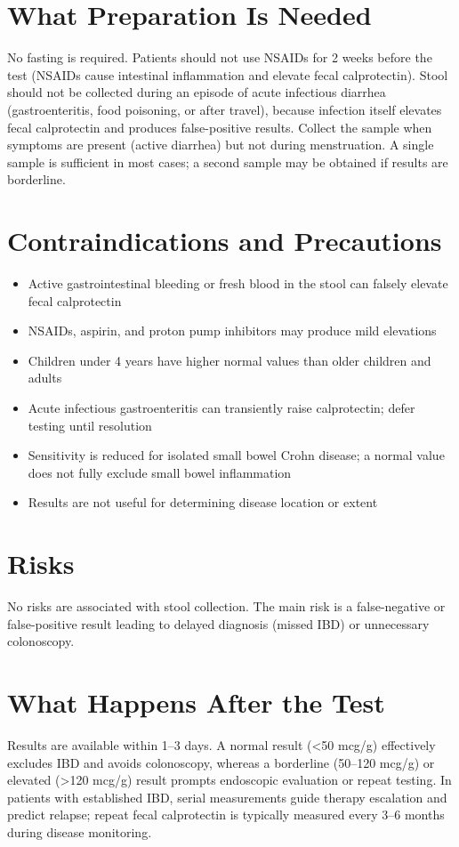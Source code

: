 \section*{What Preparation Is Needed}
No fasting is required. Patients should not use NSAIDs for 2 weeks before the test (NSAIDs cause intestinal inflammation and elevate fecal calprotectin). Stool should not be collected during an episode of acute infectious diarrhea (gastroenteritis, food poisoning, or after travel), because infection itself elevates fecal calprotectin and produces false-positive results. Collect the sample when symptoms are present (active diarrhea) but not during menstruation. A single sample is sufficient in most cases; a second sample may be obtained if results are borderline.

\section*{Contraindications and Precautions}
\begin{itemize}
  \item Active gastrointestinal bleeding or fresh blood in the stool can falsely elevate fecal calprotectin
  \item NSAIDs, aspirin, and proton pump inhibitors may produce mild elevations
  \item Children under 4 years have higher normal values than older children and adults
  \item Acute infectious gastroenteritis can transiently raise calprotectin; defer testing until resolution
  \item Sensitivity is reduced for isolated small bowel Crohn disease; a normal value does not fully exclude small bowel inflammation
  \item Results are not useful for determining disease location or extent
\end{itemize}
\section*{Risks}
No risks are associated with stool collection. The main risk is a false-negative or false-positive result leading to delayed diagnosis (missed IBD) or unnecessary colonoscopy.

\section*{What Happens After the Test}
Results are available within 1--3 days. A normal result (<50 mcg/g) effectively excludes IBD and avoids colonoscopy, whereas a borderline (50--120 mcg/g) or elevated (>120 mcg/g) result prompts endoscopic evaluation or repeat testing. In patients with established IBD, serial measurements guide therapy escalation and predict relapse; repeat fecal calprotectin is typically measured every 3--6 months during disease monitoring.

